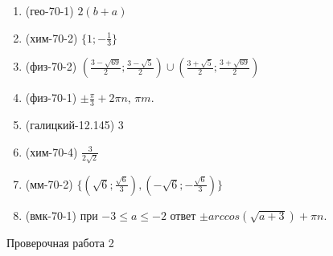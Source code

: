 \documentclass[11pt,a5paper]{report}
\begin{document}
\begin{enumerate}

\item (гео-70-1) $2(b+a)$

\item (хим-70-2) $\{1; -\frac{1}{3}\}$

\item (физ-70-2) $(\frac{3 - \sqrt{69}}{2}; \frac{3 - \sqrt{5}}{2}) \cup (\frac{3 + \sqrt{5}}{2}; \frac{3 + \sqrt{69}}{2})$

\item (физ-70-1) $\pm \frac{\pi}{3} + 2 \pi n$, $\pi m$.

\item (галицкий-12.145) $3$

\item (хим-70-4) $\frac{3}{2\sqrt{2}}$

\item (мм-70-2) $\{ (\sqrt{6}; \frac{\sqrt{6}}{3}), (-\sqrt{6}; -\frac{\sqrt{6}}{3}) \}$

\item (вмк-70-1) при $-3 \leqslant a \leqslant -2$ ответ $\pm arccos(\sqrt{a+3}) + \pi n$.
\end{enumerate}
\newpage


\begin{center}
Проверочная работа 2


\end{center}
\end{document}
